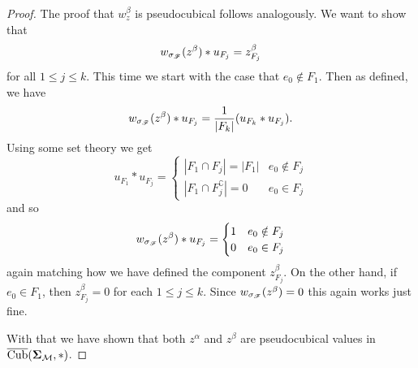 \documentclass[12pt,oneside]{../../sfsuthesis}
\begin{document}
\begin{proof}
    The proof that \(  w_z^\beta \) is pseudocubical follows analogously.
    We want to show that
    \begin{align*}
        w_{\sigma_{\mathscr{F}}}(z^\beta) \ast u_{F_j} = z^\beta_{F_j}
    \end{align*}
    for all \( 1 \leq j \leq k \).
    This time we start with the case that \( e_0 \notin F_1 \).
    Then as defined, we have
    \[
        w_{\sigma_{\mathscr{F}}}(z^\beta) \ast u_{F_j} = {\frac{1}{|F_k|}}(u_{F_k} \ast u_{F_j}).
    \]
    Using some set theory we get
    \[
        u_{F_1} \ast u_{F_j} =
        \begin{cases}
            |F_1 \cap F_j| = |F_1|         & e_0 \notin F_j \\
            |F_1 \cap F_j^\complement| = 0 & e_0 \in F_j
        \end{cases}
    \]
    and so
    \[
        w_{\sigma_{\mathscr{F}}}(z^\beta) \ast u_{F_j} = \begin{cases}
            1 & e_0 \notin F_j \\
            0 & e_0 \in F_j
        \end{cases}
    \]
    again matching how we have defined the component \( z^\beta_{F_j} \).
    On the other hand, if \( e_0 \in F_1 \), then \( z^\beta_{F_j} = 0 \) for each \( 1 \leq j \leq k \).
    Since \( w_{\sigma_{\mathscr{F}}}(z^\beta) = 0 \) this again works just fine.

    With that we have shown that both \( z^\alpha \) and \( z^\beta \) are pseudocubical values in \( \operatorname{\overline{Cub}}({\bm{\Sigma}}_{\mathcal{M}}, \ast) \).
\end{proof}
\end{document}
